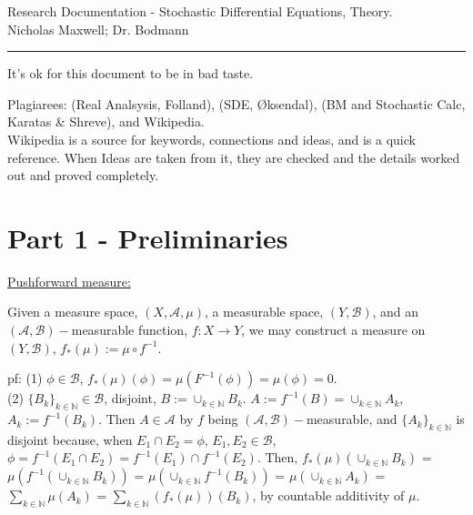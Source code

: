 \documentclass[12pt]{article}
\newcommand{\nats}[0] { \mathbb{N}}
\newcommand{\A}[0] { \mathcal{A} }
\newcommand{\B}[0] { \mathcal{B} }
\begin{document}
\begin{flushleft}
Research Documentation - Stochastic Differential Equations, Theory. \\
Nicholas Maxwell; Dr. Bodmann\\
\end{flushleft}

\begin{flushleft}
\addvspace{5pt} \hrule
\end{flushleft}	


\begin{flushleft}
It's ok for this document to be in bad taste.
\end{flushleft}

\begin{flushleft}
Plagiarees: (Real Analsysis, Folland), (SDE, \O ksendal), (BM and Stochastic Calc, Karatas \& Shreve), and Wikipedia.\\
Wikipedia is a source for keywords, connections and ideas, and is a quick reference. When Ideas are taken from it, they are checked and the details worked out and proved completely.
\end{flushleft}


\section*{Part 1 - Preliminaries }

\begin{flushleft}
\underline{Pushforward measure:}
\end{flushleft}

\begin{flushleft}
Given a measure space, $(X,\A,\mu)$, a measurable space, $(Y,\B)$, and an $(\A,\B)-$measurable function, $f:X \rightarrow Y$, we may construct a measure on $(Y,\B)$,  $f_*(\mu) := \mu \circ f^{-1}$.\\
\end{flushleft}

\begin{flushleft}
pf: (1) $\phi \in \B$, $f_*(\mu) (\phi) = \mu(F^{-1}(\phi)) = \mu(\phi) = 0$. \\
(2) $\{ B_k \}_{k \in \nats } \in \B $, disjoint, $B := \cup_{k \in \nats} B_k$. $A := f^{-1}(B) = \cup_{k \in \nats} A_k $, $A_k := f^{-1}(B_k)$. Then $A \in \A$ by $f$ being $(\A,\B)-$measurable, and $\{ A_k \}_{k \in \nats }$ is disjoint because, when $E_1 \cap E_2 = \phi$, $E_1, E_2 \in \B$, $ \phi = f^{-1}(E_1 \cap E_2) = f^{-1}(E_1) \cap f^{-1}(E_2)$. Then, $f_*(\mu) ( \cup_{k \in \nats} B_k )$  = $\mu( f^{-1}( \cup_{k \in \nats} B_k ) )$ = $\mu( \cup_{k \in \nats} f^{-1}( B_k ) )$ = $\mu( \cup_{k \in \nats} A_k )$ = $ \sum_{k \in \nats } \mu( A_k ) $ = $ \sum_{k \in \nats } (f_*(\mu))( B_k ) $, by countable additivity of $\mu$.
\end{flushleft}
\end{document}
